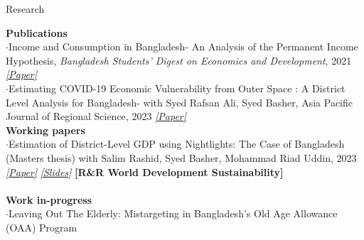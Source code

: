 \documentclass[
	11pt, %
]{resume} %
\begin{document}
	\vspace{-10pt}
\begin{rSection}{Research}

\textbf{{Publications}} \\
$\cdot$Income and Consumption in Bangladesh- An Analysis of the Permanent Income Hypothesis, \textit{Bangladesh Students’ Digest on Economics and Development}, 2021 \textit{\href{https://www.researchgate.net/publication/358138834_Income_and_Consumption_in_Bangladesh-An_Analysis_of_the_Permanent_Income_Hypothesis}{[Paper]}} \\
	$\cdot$Estimating COVID-19 Economic Vulnerability from Outer Space : A District Level Analysis for Bangladesh- with Syed Rafsan Ali, Syed Basher, Asia Pacific Journal of Regional Science, 2023 \textit{\href{https://papers.ssrn.com/sol3/papers.cfm?abstract_id=4589298}{[Paper]}} \\

	\vspace{-6pt}
	\textbf{Working papers} \\
	$\cdot$Estimation of District-Level GDP using Nightlights: The Case of Bangladesh (Masters thesis) with Salim Rashid, Syed Basher, Mohammad Riad Uddin, 2023   \textit{\href{https://papers.ssrn.com/sol3/papers.cfm?abstract_id=4373887}{[Paper]}} \textit{\href{https://drive.google.com/file/d/1Fcz9kcQH-0bsl6-8REYTjoXooL8vKHHT/view}{[Slides]}} \textbf{[R\&R World Development Sustainability] }\\ \\
	\textbf{{Work in-progress}} \\
	$\cdot$Leaving Out The Elderly: Mistargeting in Bangladesh’s Old Age Allowance (OAA) Program

		
\end{rSection}
\end{document}
